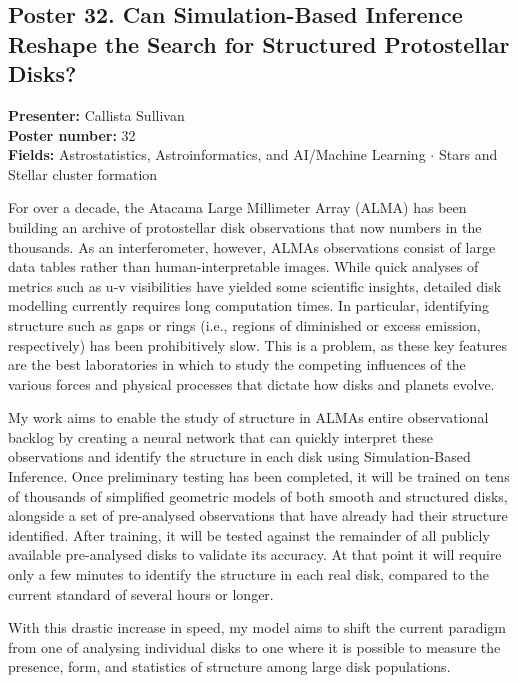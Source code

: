 \hypertarget{poster-abstract-talk-229}{}\label{poster-abstract-page-talk-229}
\subsection*{Poster 32. Can Simulation-Based Inference Reshape the Search for Structured Protostellar Disks?}
\textbf{Presenter:} Callista Sullivan\\
\textbf{Poster number:} 32\\
\textbf{Fields:} Astrostatistics, Astroinformatics, and AI/Machine Learning $\cdot$ Stars and Stellar cluster formation

For over a decade, the Atacama Large Millimeter Array (ALMA) has been building an archive of protostellar disk observations that now numbers in the thousands. As an interferometer, however, ALMAs observations consist of large data tables rather than human-interpretable images. While quick analyses of metrics such as u-v visibilities have yielded some scientific insights, detailed disk modelling currently requires long computation times. In particular, identifying structure such as gaps or rings (i.e., regions of diminished or excess emission, respectively) has been prohibitively slow. This is a problem, as these key features are the best laboratories in which to study the competing influences of the various forces and physical processes that dictate how disks and planets evolve.

My work aims to enable the study of structure in ALMAs entire observational backlog by creating a neural network that can quickly interpret these observations and identify the structure in each disk using Simulation-Based Inference. Once preliminary testing has been completed, it will be trained on tens of thousands of simplified geometric models of both smooth and structured disks, alongside a set of pre-analysed observations that have already had their structure identified. After training, it will be tested against the remainder of all publicly available pre-analysed disks to validate its accuracy. At that point it will require only a few minutes to identify the structure in each real disk, compared to the current standard of several hours or longer.

With this drastic increase in speed, my model aims to shift the current paradigm from one of analysing individual disks to one where it is possible to measure the presence, form, and statistics of structure among large disk populations.

\hypertarget{poster-abstract-talk-336}{}\label{poster-abstract-page-talk-336}
